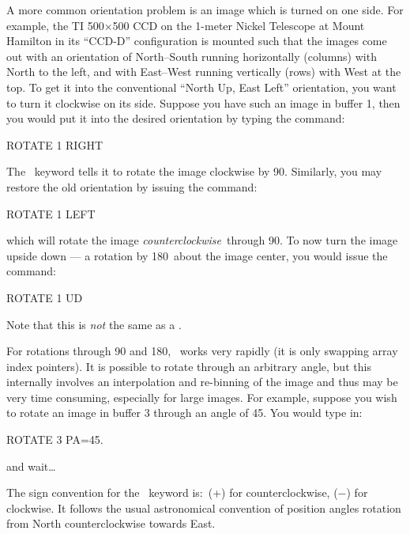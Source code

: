 A more common orientation problem is an image which is turned on one side. For
example, the TI 500$\times$500 CCD on the 1-meter Nickel Telescope at Mount
Hamilton in its ``CCD-D'' configuration is mounted such that the images come
out with an orientation of North--South running horizontally (columns) with
North to the left, and with East--West running vertically (rows) with West at
the top.  To get it into the conventional ``North Up, East Left'' orientation,
you want to turn it clockwise on its side.  Suppose you have such an image in
buffer 1, then you would put it into the desired orientation by typing the
command: 
\begin{command}
      \item ROTATE 1 RIGHT
\end{command}
The \ keyword tells it to rotate the image clockwise 
by 90\deg.  Similarly, you may restore the old orientation by issuing the
command:
\begin{command}
      \item ROTATE 1 LEFT
\end{command}
which will rotate the image {\it counterclockwise}\ through 90\deg.
To now turn the image upside down --- a rotation by 180\deg\ about
the image center, you would issue the command:
\begin{command}
      \item ROTATE 1 UD
\end{command}
Note that this is {\it not} the same as a .

For rotations through 90 and 180\deg, \ works very rapidly (it is
only swapping array index pointers).  It is possible to rotate through an
arbitrary angle, but this internally involves an interpolation and re-binning
of the image and thus may be very time consuming, especially for large images.
For example, suppose you wish to rotate an image in buffer 3 through an angle
of 45\deg.  You would type in: 
\begin{command}
      \item ROTATE 3 PA=45.
\end{command}
and wait\ldots

The sign convention for the \ keyword is:\ (+) for counterclockwise,
($-$) for clockwise.  It follows the usual astronomical convention of position
angles rotation from North counterclockwise towards East. 


